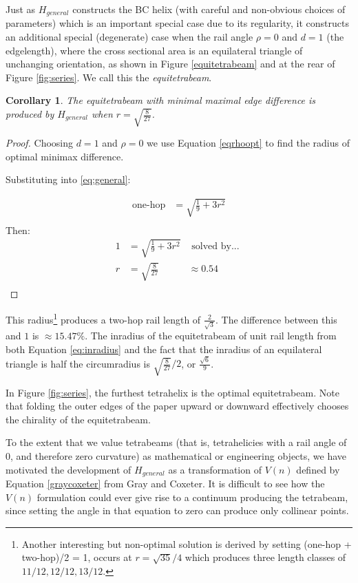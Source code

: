 \documentclass[11pt]{article}
\newtheorem{corollary}{Corollary}
\begin{document}
Just as $H_{general}$ constructs the BC helix (with careful and non-obvious choices of parameters)
which is an important
special case due to its regularity, it constructs an additional special
(degenerate) case when the rail angle $\rho = 0$
and $d = 1$ (the edgelength), where the cross sectional area is
an equilateral triangle of unchanging orientation, as shown in Figure \ref{equitetrabeam} and at the rear of Figure \ref{fig:series}.
We call this the \emph{equitetrabeam}.



\begin{corollary}
  The equitetrabeam with minimal maximal edge difference is produced
  by $H_{general}$ when $ r = \sqrt{\frac{8}{27}} $.
\end{corollary}

\begin{proof}
Choosing $d = 1$ and $\rho = 0$ we use Equation \eqref{eqrhoopt} to find the radius of 
optimal minimax difference.

Substituting into \eqref{eq:general}:

\begin{align*}
  \text{one-hop} &= \sqrt{\frac{1}{9} + 3r^2}\\
\end{align*}
Then:
\begin{align*}
   1  &=  \sqrt{\frac{1}{9} + 3r^2} & \text{ solved by... }\\
   r  &= \sqrt{\frac{8}{27}} &\approx 0.54 \\
\end{align*}
\end{proof}

This radius\footnote{Another interesting but non-optimal solution is derived by setting
  (one-hop + two-hop)/2 = 1,
  occurs at $r = \sqrt{35}/4$ which produces
  three length classes of $11/12, 12/12, 13/12$.}
produces a two-hop rail length of $\frac{2}{\sqrt{3}}$.
The difference between this and $1$ is $\approx 15.47\% $. The inradius of the equitetrabeam of unit
rail length from both Equation \eqref{eq:inradius} and the fact that the inradius of
an equilateral triangle is half the circumradius is $\sqrt{\frac{8}{27}}/2$, or $\frac{\sqrt{6}}{9}$.


In Figure \ref{fig:series}, the furthest tetrahelix is the optimal equitetrabeam.
Note that folding the outer edges of the paper upward or downward effectively
chooses the chirality of the equitetrabeam.

To the extent that we value tetrabeams (that is, tetrahelicies with a rail angle of $0$,
and therefore zero curvature) as mathematical or engineering objects,
we have motivated the development of $H_{general}$ as a transformation of $V(n)$ defined by
Equation \eqref{graycoxeter} from Gray and Coxeter. It is difficult to see how
the $V(n)$ 
formulation could ever give rise to a continuum producing the tetrabeam,
since setting the angle in that equation to zero can produce only collinear points.
\end{document}
